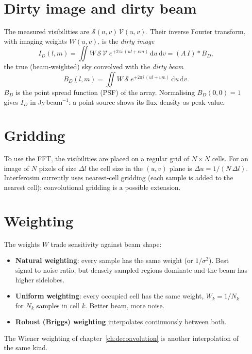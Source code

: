 
\section{Dirty image and dirty beam}

The measured visibilities are $\mathcal S(u,v)\,\mathcal V(u,v)$. Their
inverse Fourier transform, with imaging weights $W(u,v)$, is the
\emph{dirty image}
\begin{equation}
  I_D(l,m) = \iint W\,\mathcal S\,\mathcal V\;
             e^{+2\pi i\,(ul+vm)}\,\mathrm{d}u\,\mathrm{d}v
           = (A\,I) * B_D ,
\end{equation}
the true (beam-weighted) sky convolved with the \emph{dirty beam}
\begin{equation}
  B_D(l,m) = \iint W\,\mathcal S\;e^{+2\pi i\,(ul+vm)}\,\mathrm{d}u\,\mathrm{d}v .
\end{equation}
$B_D$ is the point spread function (PSF) of the array. Normalising
$B_D(0,0)=1$ gives $I_D$ in Jy\,beam$^{-1}$: a point source shows its
flux density as peak value.

\section{Gridding}

To use the FFT, the visibilities are placed on a regular grid of
$N\times N$ cells. For an image of $N$ pixels of size $\Delta l$ the
cell size in the $(u,v)$ plane is $\Delta u = 1/(N\,\Delta l)$.
Interferosim currently uses nearest-cell gridding (each sample is added
to the nearest cell); convolutional gridding is a possible extension.

\section{Weighting}

The weights $W$ trade sensitivity against beam shape:
\begin{itemize}
  \item \textbf{Natural weighting}: every sample has the same weight
        (or $1/\sigma^2$). Best signal-to-noise ratio, but densely
        sampled regions dominate and the beam has higher sidelobes.
  \item \textbf{Uniform weighting}: every occupied cell has the same
        weight, $W_k = 1/N_k$ for $N_k$ samples in cell $k$. Better
        beam, more noise.
  \item \textbf{Robust (Briggs) weighting} \cite{briggs1995}
        interpolates continuously between both.
\end{itemize}
The Wiener weighting of chapter~\ref{ch:deconvolution} is another
interpolation of the same kind.
